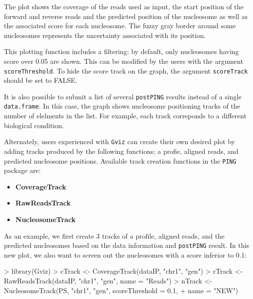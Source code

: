 \documentclass[11pt]{article}
\begin{document}
The plot shows the coverage of the reads used as input, the start position of the forward and reverse reads and the predicted position of the nucleosome as well as the associated score for each nucleosome. The fuzzy gray border around some nucleosomes represents the uncertainty associated with its position.

This plotting function includes a filtering: by default, only nucleosomes having score over 0.05 are shown. This can be modified by the users with the argument \texttt{scoreThreshold}. To hide the score track on the graph, the argument \texttt{scoreTrack} should be set to FALSE.

It is also possible to submit a list of several \texttt{postPING} results instead of a single \texttt{data.frame}. In this case, the graph shows nucleosome positioning tracks of the number of elelments in the list. For example, each track correponds to a different biological condition. 

\vspace{10pt}
Alternately, users experienced with \texttt{Gviz} can create their own desired plot by adding tracks produced by the following functions; a profie, aligned reads, and predicted nucleosome positions. Available track creation functions in the \texttt{PING} package are:

\begin{itemize}
\item \textbf{CoverageTrack}
\item \textbf{RawReadsTrack}
\item \textbf{NucleosomeTrack}
\end{itemize}

As an example, we first create $3$ tracks of a profile, aligned reads, and the predicted nucleosomes based on the data information and \texttt{postPING} result. In this new plot, we also want to screen out the nucleosomes with a score inferior to 0.1:
\begin{Schunk}
\begin{Sinput}
> library(Gviz)
> cTrack <- CoverageTrack(dataIP, "chr1", "gen")
> rTrack <- RawReadsTrack(dataIP, "chr1", "gen", name = "Reads")
> nTrack <- NucleosomeTrack(PS, "chr1", "gen", scoreThreshold = 0.1, 
+     name = "NEW")
\end{Sinput}
\end{Schunk}
\end{document}
